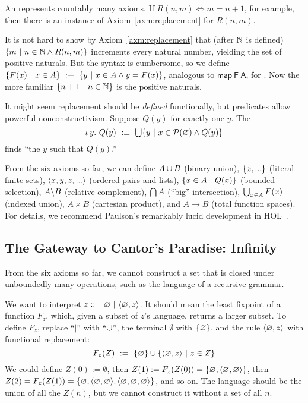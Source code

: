 An  represents countably many axioms. If $R(n,m) \iff m = n+1$, for example, then there is an instance of Axiom~\ref{axm:replacement} for $R(n,m)$.

It is not hard to show by Axiom~\ref{axm:replacement} that (after $\mathbb{N}$ is defined) $\lbrace {m} \ \lvert\ {n \in \mathbb{N} \wedge R(n,m)} \rbrace$ increments every natural number, yielding the set of positive naturals. But the syntax is cumbersome, so we define $\lbrace {F(x)} \ \lvert\ {x \in A} \rbrace\ :\equiv\ \lbrace {y} \ \lvert\ {x \in A \wedge y = F(x)} \rbrace$, analogous to $\mathsf{map~F~A}$, for . Now the more familiar $\lbrace {n + 1} \ \lvert\ {n \in \mathbb{N}} \rbrace$ is the positive naturals.

It might seem replacement should be \emph{defined} functionally, but predicates allow powerful nonconstructivism.
Suppose $Q(y)$ for exactly one $y$.
The 
\begin{equation}
	\iota\,{y}\ldotp\, Q(y)\ :\equiv\ \textstyle\bigcup \lbrace {y} \ \lvert\ {x \in \mathcal{P}(\varnothing) \wedge Q(y)} \rbrace
\end{equation}
finds ``the $y$ such that $Q(y)$.''

From the six axioms so far, we can define $A \cup B$ (binary union), $\{{x,...}\}$ (literal finite sets), $\langle{x,y,z,...}\rangle$ (ordered pairs and lists), $\lbrace {x \in A} \ \lvert\ {Q(x)} \rbrace$ (bounded selection), $A \backslash B$ (relative complement), $\textstyle\bigcap A$ (``big'' intersection), $\textstyle\bigcup_{x \in A} F(x)$ (indexed union), $A \times B$ (cartesian product), and $A \to B$ (total function spaces).
For details, we recommend Paulson's remarkably lucid development in HOL~\cite{cit:paulson-1993-settheory-i}.

\subsection{The Gateway to Cantor's Paradise: Infinity}
\label{sec:axiom-of-infinity}

From the six axioms so far, we cannot construct a set that is closed under unboundedly many operations, such as the language of a recursive grammar.
\begin{example}
We want to interpret $z ::= \emptyset \ |\ \pair{\emptyset,z}$. It should mean the least fixpoint of a function $F_z$, which, given a subset of $z$'s language, returns a larger subset. To define $F_z$, replace ``$|$'' with ``$\cup$'', the terminal $\emptyset$ with $\{{\varnothing}\}$, and the rule $\langle{\varnothing,z}\rangle$ with functional replacement:
\begin{equation}
	F_z(Z)\ \metadef\ \set{\emptyset} \u \setb{\pair{\emptyset,z}}{z \in Z}
\label{eqn:f-of-z}
\end{equation}
We could define $Z(0) := \emptyset$, then $Z(1) := F_z(Z(0)) = \{{\varnothing,\langle{\varnothing,\varnothing}\rangle}\} $, then $Z(2) = F_z(Z(1)) = \{{\varnothing, \langle{\varnothing,\varnothing}\rangle, \langle{\varnothing,\varnothing,\varnothing}\rangle}\}$, and so on. The language should be the union of all the $Z(n)$, but we cannot construct it without a set of all $n$.
\exampleqed
\end{example}


